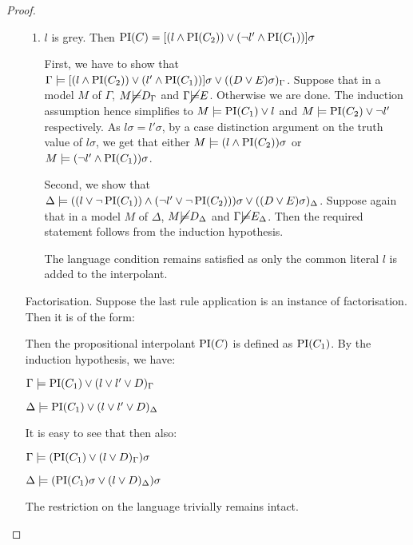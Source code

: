 \begin{proof}
\begin{itemize}
\begin{enumerate}
				\item $l$ is grey.
					Then $\operatorname{PI}(C) = [(l \land \operatorname{PI}(C_2)) \lor (\lnot l' \land \operatorname{PI}(C_1)) ]\sigma $

					First, we have to show that 
					$ \Gamma \models [(l \land \operatorname{PI}(C_2)) \lor (l' \land \operatorname{PI}(C_1)) ]\sigma \lor ((D \lor E)\sigma)_\Gamma$.
					Suppose that in a model $M$ of $\Gamma$, $M \cancel {\models} D_\Gamma$ and $\Gamma \cancel {\models} E$. Otherwise we are done.
					The induction assumption hence simplifies to $M \models \operatorname{PI}(C_1) \lor l$ and $M \models \operatorname{PI}(C_2) \lor \lnot l'$ respectively.
					As $l\sigma = l'\sigma$, by a case distinction argument on the truth value of $l\sigma$, we get that either $M \models (l \land \operatorname{PI}(C_2))\sigma$ or $M \models  (\lnot l' \land \operatorname{PI}(C_1))\sigma$.


					Second, we show that 
					$\Delta \models ((l \lor \lnot \operatorname{PI}(C_1)) \land (\lnot l' \lor \lnot \operatorname{PI}(C_2)))\sigma \lor ((D \lor E)\sigma)_\Delta$.
					Suppose again that in a model $M$ of $\Delta$, $M \cancel {\models} D_\Delta$ and $\Gamma \cancel {\models} E_\Delta$. 
					Then the required statement follows from the induction hypothesis.

					The language condition remains satisfied as only the common literal $l$ is added to the interpolant.


			\end{enumerate}

		\item[Factorisation.]	
			Suppose the last rule application is an instance of factorisation. Then it is of the form:
			\begin{prooftree}
			\end{prooftree}

			Then the propositional interpolant $\operatorname{PI}(C)$ is defined as $\operatorname{PI}(C_1)$.
			By the induction hypothesis, we have:

			$\Gamma \models \operatorname{PI}(C_1) \lor (l \lor l' \lor D)_\Gamma$

			$\Delta \models \operatorname{PI}(C_1) \lor (l \lor l' \lor D)_\Delta$

			It is easy to see that then also:

			$\Gamma \models (\operatorname{PI}(C_1)\lor (l \lor D)_\Gamma)\sigma$

			$\Delta \models (\operatorname{PI}(C_1)\sigma \lor (l \lor D)_\Delta)\sigma$

			The restriction on the language trivially remains intact.



\end{itemize}
\end{proof}
